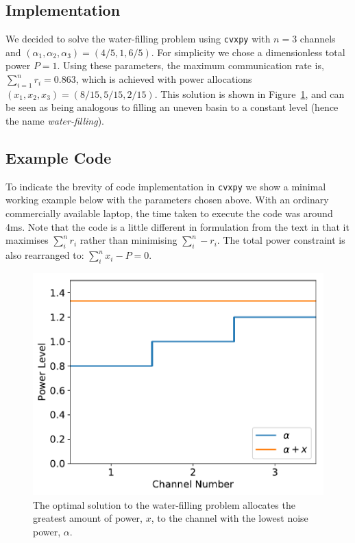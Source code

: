 \documentclass[twocolumn,secnumarabic,amssymb, nobibnotes, aps, prl,superscriptaddress]{revtex4-1}
\begin{document}
\subsection{Implementation}
\noindent We decided to solve the water-filling problem using \texttt{cvxpy} with $n=3$ channels and $(\alpha_1,\alpha_2,\alpha_3) = (4/5,1,6/5)$.  For simplicity we chose a dimensionless total power $P=1$.  Using these parameters, the maximum communication rate is, $\sum_{i=1}^{n}r_i = 0.863$, which is achieved with power allocations $(x_1,x_2,x_3) = (8/15,5/15,2/15)$.  This solution is shown in Figure~\ref{fig:waterfilling}, and can be seen as being analogous to filling an uneven basin to a constant level (hence the name \textit{water-filling}).

\subsection{Example Code}
\noindent To indicate the brevity of code implementation in \texttt{cvxpy} we show a minimal working example below with the parameters chosen above.  With an ordinary commercially available laptop, the time taken to execute the code was around 4ms. Note that the code is a little different in formulation from the text in that it maximises $\sum_{i}^nr_i$ rather than minimising $\sum_{i}^{n}-r_i$. The total power constraint is also rearranged to: $\sum_i^nx_i - P = 0$.


\begin{figure}[H]
\centering
\includegraphics[width=1.0\linewidth]{water_filling_plot.pdf}
\caption{The optimal solution to the water-filling problem allocates the greatest amount of power, $x$, to the channel with the lowest noise power, $\alpha$.}
\label{fig:waterfilling}
\end{figure}
\end{document}
